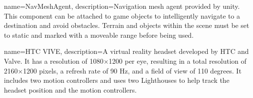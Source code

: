{name={NavMeshAgent},
	description={\glsresetall Navigation mesh agent provided by \gls{unity}. This component can be attached to game objects to intelligently navigate to a destination and avoid obstacles. Terrain and objects within the scene must be set to static and marked with a moveable range before being used.}
}



{name={HTC VIVE},
	description={\glsresetall A virtual reality headset developed by HTC and Valve. It has a resolution of 1080×1200 per eye, resulting in a total resolution of 2160×1200 pixels, a refresh rate of 90 Hz, and a field of view of 110 degrees. It includes two motion controllers and uses two Lighthouses to help track the headset position and the motion controllers.}
}






\makeglossaries
